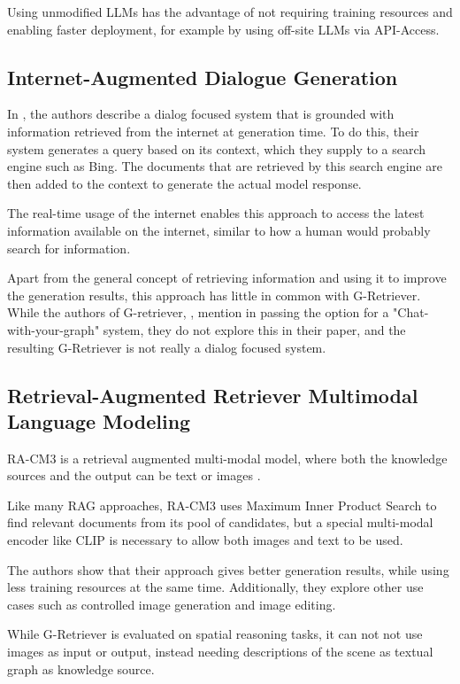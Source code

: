 Using unmodified LLMs has the advantage of not requiring training resources and enabling faster deployment, for example by using off-site LLMs via API-Access.



\subsection{Internet-Augmented Dialogue Generation}

In \cite{komeili-etal-2022-internet}, the authors describe a dialog focused system that is grounded with information retrieved from the internet at generation time.
To do this, their system generates a query based on its context, which they supply to a search engine such as Bing.
The documents that are retrieved by this search engine are then added to the context to generate the actual model response.

The real-time usage of the internet enables this approach to access the latest information available on the internet, similar to how a human would probably search for information.

Apart from the general concept of retrieving information and using it to improve the generation results, this approach has little in common with G-Retriever. While the authors of G-retriever, \citet{g-retriever}, mention in passing the option for a "Chat-with-your-graph" system, they do not explore this in their paper, and the resulting G-Retriever is not really a dialog focused system.

\subsection{Retrieval-Augmented Retriever Multimodal Language Modeling}

RA-CM3 is a retrieval augmented multi-modal model, where both the knowledge sources and the output can be text or images \cite{multimodal}.

Like many RAG approaches, RA-CM3 uses Maximum Inner Product Search to find relevant documents from its pool of candidates, but a special multi-modal encoder like CLIP is necessary to allow both images and text to be used.

The authors show that their approach gives better generation results, while using less training resources at the same time.
Additionally, they explore other use cases such as controlled image generation and image editing.

While G-Retriever is evaluated on spatial reasoning tasks, it can not not use images as input or output, instead needing descriptions of the scene as textual graph as knowledge source.

